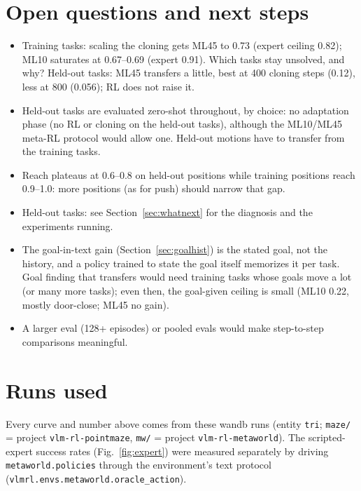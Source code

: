 \documentclass[11pt]{article}
\newcommand{\code}[1]{\texttt{#1}}
\begin{document}
\section{Open questions and next steps}
\begin{itemize}
\item Training tasks: scaling the cloning gets ML45 to 0.73 (expert ceiling 0.82); ML10 saturates at 0.67--0.69 (expert
  0.91). Which tasks stay unsolved, and why? Held-out tasks: ML45 transfers a little, best at 400 cloning steps (0.12), less at 800
  (0.056); RL does not raise it.
\item Held-out tasks are evaluated zero-shot throughout, by choice: no adaptation phase (no RL or cloning on the held-out
  tasks), although the ML10/ML45 meta-RL protocol would allow one. Held-out motions have to transfer from the training
  tasks.
\item Reach plateaus at 0.6--0.8 on held-out positions while training positions reach 0.9--1.0: more positions (as for push)
  should narrow that gap.
\item Held-out tasks: see Section~\ref{sec:whatnext} for the diagnosis and the experiments running.
\item The goal-in-text gain (Section~\ref{sec:goalhist}) is the stated goal, not the history, and a policy trained to state
  the goal itself memorizes it per task. Goal finding that transfers would need training tasks whose goals move a lot
  (or many more tasks); even then, the goal-given ceiling is small (ML10 0.22, mostly door-close; ML45 no gain).
\item A larger eval (128+ episodes) or pooled evals would make step-to-step comparisons meaningful.
\end{itemize}

\appendix
\section{Runs used}
\label{app:runs}
Every curve and number above comes from these wandb runs (entity \code{tri}; \code{maze/} = project
\code{vlm-rl-pointmaze}, \code{mw/} = project \code{vlm-rl-metaworld}). The scripted-expert success rates (Fig.~\ref{fig:expert}) were measured separately by driving
\code{metaworld.policies} through the environment's text protocol (\code{vlmrl.envs.metaworld.oracle\_action}).

{\small}
\end{document}
